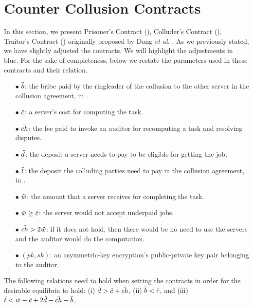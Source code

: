 

\section{Counter Collusion Contracts}\label{appendix::Counter-Collusion-Contracts}

In this section, we present Prisoner’s Contract (\SCpc), Colluder’s Contract (\SCcc), Traitor’s Contract (\SCtc) originally proposed by Dong \textit{et al.} \cite{dong2017betrayal}. As we previously stated, we have slightly adjusted the contracts.  We will highlight the adjustments in blue. For the sake of completeness, below we restate the parameters used in these contracts and their relation. 


\begin{itemize}
\item[$\bullet$] $\ddot{b}$: the bribe paid by the ringleader of the collusion to the other
server in the collusion agreement, in \SCcc.
%
\item[$\bullet$] $\ddot{c}$: a server’s cost for computing the task.
%
\item[$\bullet$] $\ddot{ch}$: the fee paid to invoke an auditor for recomputing a task and resolving
disputes.
%
\item[$\bullet$] $\ddot{d}$: the deposit a server needs to pay to be eligible for getting the job.
%
\item[$\bullet$] $\ddot{t}$: the deposit the colluding parties need to pay in the collusion agreement, in \SCcc.
%
\item[$\bullet$] $\ddot{w}$: the amount that a server receives for completing the task.
%
\item[$\bullet$] $\ddot{w} \geq \ddot{c}$: the server would not accept underpaid jobs.
%
\item[$\bullet$] $\ddot{ch} > 2\ddot{w}$: if it does not hold, then there would be no need to use the servers and the auditor would do the computation.
%
\item [$\bullet$] $(pk,sk)$: an asymmetric-key encryption's public-private key pair belonging to the auditor. 
\end{itemize}
\noindent The following relations need to hold when setting the contracts
in order for the desirable equilibria to hold:
%
(i) $\ddot{d}>\ddot{c}+\ddot{ch}$, (ii) $\ddot{b}<\ddot{c}$, and (iii) $\ddot{t}<\ddot{w}-\ddot{c} + 2\ddot{d} - \ddot{ch} -\ddot{b}$.











